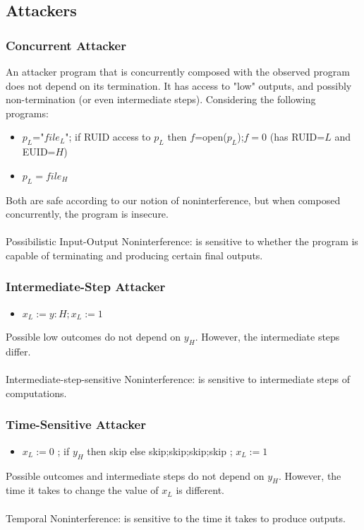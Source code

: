 \documentclass[10pt,a4paper]{report}
\begin{document}
\subsection{Attackers}
\subsubsection{Concurrent Attacker}
An attacker program that is concurrently composed with the observed program does not depend on its termination. It has access to "low" outputs, and possibly non-termination (or even intermediate steps). Considering the following programs:
\begin{itemize}
\item $p_L$="$file_L$"; if RUID access to $p_L$ then $f$=open($p_L$);$f=0$ (has RUID=$L$ and EUID=$H$)
\item $p_L = file_H$
\end{itemize}
Both are safe according to our notion of noninterference, but when composed concurrently, the program is insecure.\\
\\
Possibilistic Input-Output Noninterference: is sensitive to whether the program is capable of terminating and producing certain final outputs.
\subsubsection{Intermediate-Step Attacker}
\begin{itemize}
\item $x_L := y:H ; x_L := 1$
\end{itemize}
Possible low outcomes do not depend on $y_H$. However, the intermediate steps differ.\\
\\
Intermediate-step-sensitive Noninterference: is sensitive to intermediate steps of computations.
\subsubsection{Time-Sensitive Attacker}
\begin{itemize}
\item $x_L:=0$ ; if $y_H$ then skip else skip;skip;skip;skip ; $x_L:=1$
\end{itemize}
Possible outcomes and intermediate steps do not depend on $y_H$. However, the time it takes to change the value of $x_L$ is different.\\
\\
Temporal Noninterference: is sensitive to the time it takes to produce outputs.
\end{document}
